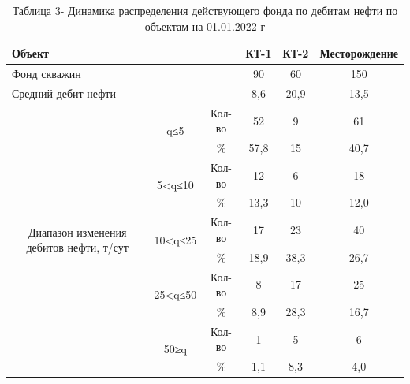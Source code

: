 \begin{table}[H]
\caption*{Таблица 3- Динамика распределения действующего фонда по дебитам нефти по объектам на 01.01.2022 г}
\centering
\begin{tabular}{|ccc|c|c|c|}
\hline
\multicolumn{3}{|l|}{Объект} & КТ-1 & КТ-2 & Месторождение \\ \hline
\multicolumn{3}{|l|}{Фонд скважин} & 90 & 60 & 150 \\ \hline
\multicolumn{3}{|l|}{Средний дебит нефти} & 8,6 & 20,9 & 13,5 \\ \hline
\multicolumn{1}{|p{0.2\textwidth}|}{\multirow{10}{=}{Диапазон изменения дебитов нефти, т/сут}} & \multicolumn{1}{c|}{\multirow{2}{*}{q≤5}} & Кол-во & 52 & 9 & 61 \\ \cline{3-6} 
\multicolumn{1}{|l|}{} & \multicolumn{1}{c|}{} & \% & 57,8 & 15 & 40,7 \\ \cline{2-6} 
\multicolumn{1}{|l|}{} & \multicolumn{1}{c|}{\multirow{2}{*}{5<q≤10}} & Кол-во & 12 & 6 & 18 \\ \cline{3-6} 
\multicolumn{1}{|l|}{} & \multicolumn{1}{c|}{} & \% & 13,3 & 10 & 12,0 \\ \cline{2-6} 
\multicolumn{1}{|l|}{} & \multicolumn{1}{c|}{\multirow{2}{*}{10<q≤25}} & Кол-во & 17 & 23 & 40 \\ \cline{3-6} 
\multicolumn{1}{|l|}{} & \multicolumn{1}{c|}{} & \% & 18,9 & 38,3 & 26,7 \\ \cline{2-6} 
\multicolumn{1}{|l|}{} & \multicolumn{1}{c|}{\multirow{2}{*}{25<q≤50}} & Кол-во & 8 & 17 & 25 \\ \cline{3-6} 
\multicolumn{1}{|l|}{} & \multicolumn{1}{c|}{} & \% & 8,9 & 28,3 & 16,7 \\ \cline{2-6} 
\multicolumn{1}{|l|}{} & \multicolumn{1}{c|}{\multirow{2}{*}{50≥q}} & Кол-во & 1 & 5 & 6 \\ \cline{3-6} 
\multicolumn{1}{|l|}{} & \multicolumn{1}{c|}{} & \% & 1,1 & 8,3 & 4,0 \\ \hline
\end{tabular}
\end{table}

